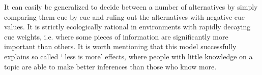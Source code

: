 It can easily be generalized to decide between a number of alternatives by simply comparing them cue by cue and ruling out the alternatives with negative cue values.
It is strictly ecologically rational in environments with rapidly decaying cue weights, i.e. where some pieces of information are significantly more important than others. It is worth mentioning that this model successfully explains so called ` less is more' effects, where people with little knowledge on a topic are able to make better inferences than those who know more.



